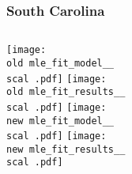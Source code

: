 \documentclass{beamer}
\newcommand{\old}{api-370-prod/pyseir/state_summaries/reports/}
\newcommand{\new}{new/pyseir/state_summaries/reports/}
\newcommand{\ri}{Rhode Island__44}
\newcommand{\scal}{South Carolina__45}
\newcommand{\sd}{South Dakota__46}
\newcommand{\tn}{Tennessee__47}
\newcommand{\tx}{Texas__48}
\newcommand{\ut}{Utah__49}
\newcommand{\vt}{Vermont__50}
\newcommand{\va}{Virgina__51}
\newcommand{\wa}{Washington__53}
\newcommand{\wv}{West Virgina__54}
\newcommand{\wi}{Wisconsin__55}
\newcommand{\wy}{Wyoming__56}
\begin{document}
\begin{frame}
\frametitle{South Carolina}
    \begin{columns}[t]
       \texttt{[image: \\old mle\_fit\_model\_\_\\scal .pdf]}
       \texttt{[image: \\old mle\_fit\_results\_\_\\scal .pdf]}   
       \texttt{[image: \\new mle\_fit\_model\_\_\\scal .pdf]}
       \texttt{[image: \\new mle\_fit\_results\_\_\\scal .pdf]}   
\end{columns}
\end{frame}


\iffalse
\newcommand{\ri}{Rhode Island__44}
\newcommand{\scal}{South Carolina__45}
\newcommand{\sd}{South Dakota__46}
\newcommand{\tn}{Tennessee__47}
\newcommand{\tx}{Texas__48}
\newcommand{\ut}{Utah__49}
\newcommand{\vt}{Vermont__50}
\newcommand{\va}{Virgina__51}
\newcommand{\wa}{Washington__53}
\newcommand{\wv}{West Virgina__54}
\newcommand{\wi}{Wisconsin__55}
\newcommand{\wy}{Wyoming__56}
\fi
\end{document}
